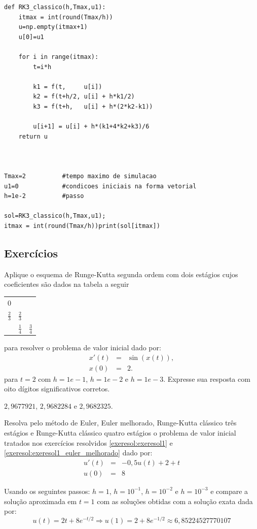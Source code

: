 \begin{exeresol}
\begin{verbatim}
def RK3_classico(h,Tmax,u1):
  	itmax = int(round(Tmax/h))
	u=np.empty(itmax+1)
	u[0]=u1

	for i in range(itmax):
		t=i*h

		k1 = f(t,     u[i])
		k2 = f(t+h/2, u[i] + h*k1/2)
		k3 = f(t+h,   u[i] + h*(2*k2-k1))

		u[i+1] = u[i] + h*(k1+4*k2+k3)/6
	return u



Tmax=2			#tempo maximo de simulacao
u1=0			#condicoes iniciais na forma vetorial
h=1e-2			#passo

sol=RK3_classico(h,Tmax,u1);
itmax = int(round(Tmax/h))print(sol[itmax])
\end{verbatim}

\fi

\end{exeresol}

\subsection*{Exercícios}
\begin{exer} Aplique o esquema de Runge-Kutta segunda ordem com dois estágios cujos coeficientes são dados na tabela a seguir
 \begin{tabular}{c|cc}
  $0$ &   &   \\
  $\frac{2}{3}$ & $\frac{2}{3}$ &   \\  \hline
    & $\frac{1}{4}$ & $\frac{3}{4}$
\end{tabular}
para resolver o problema de valor inicial dado por:
\begin{eqnarray}
x'(t)&=&\sin(x(t)),\\
x(0)&=&2.
\end{eqnarray}
para $t=2$ com $h=1e-1$, $h=1e-2$ e $h=1e-3$. Expresse sua resposta com oito dígitos significativos corretos.
\end{exer}
\begin{resp}
 $2,9677921$, $2,9682284$ e $2,9682325$.
\end{resp}


\begin{exer}Resolva pelo método de Euler, Euler melhorado, Runge-Kutta clássico três estágios e Runge-Kutta clássico quatro estágios o problema de valor inicial tratados nos  exercícios resolvidos \ref{exeresol:exeresol1} e \ref{exeresol:exeresol1_euler_melhorado} dado por:
\begin{eqnarray}
     u'(t)&=& -0,5u(t)+2+t\\
            u(0) &=&  8
\end{eqnarray}

Usando os seguintes passos: $h=1$, $h=10^{-1}$, $h=10^{-2}$ e $h=10^{-3}$ e compare a solução aproximada em $t=1$ com as soluções obtidas com a solução exata dada por:
\begin{equation}
     u(t) = 2t+8e^{-t/2} \Longrightarrow u(1)=2+8e^{-1/2} \approx 6,85224527770107
\end{equation}
\end{exer}

